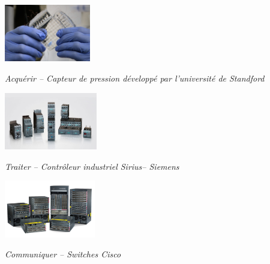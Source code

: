 \documentclass[10pt]{article}
\newif\ifxp
\begin{document}
\ifxp

\else

\fi



\begin{minipage}[c]{.3\linewidth}
\begin{center}
\includegraphics[height=2.5cm]{images/capteur1}

\textit{Acquérir -- Capteur de pression développé par l'université de Standford \cite{capteur1}}
\end{center}
\end{minipage}\hfill
\begin{minipage}[c]{.3\linewidth}
\begin{center}
\includegraphics[height=2.5cm]{images/siemens}

\textit{Traiter -- Contrôleur industriel Sirius-- Siemens \cite{siemens}}
\end{center}
\end{minipage}\hfill
\begin{minipage}[c]{.3\linewidth}
\begin{center}
\includegraphics[height=2.5cm]{images/switch}

\textit{Communiquer -- Switches Cisco \cite{cisco}}
\end{center}
\end{minipage}

\vspace{1cm}

\setlength{\parskip}{0ex plus 0.2ex minus 0ex}
 \renewcommand{\contentsname}{}
 \renewcommand{\baselinestretch}{1}

\tableofcontents

 \renewcommand{\baselinestretch}{1.2}
\setlength{\parskip}{2ex plus 0.5ex minus 0.2ex}
\end{document}
